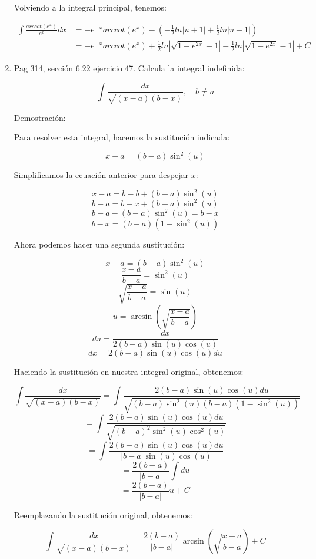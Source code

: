 \documentclass{report}
\begin{document}
\begin{enumerate}
        Volviendo a la integral principal, tenemos:
        
        \begin{align*}
        \int{\frac{arccot{\left(e^x\right)}}{e^x}dx} &= -e^{-x}arccot{\left(e^x\right)} - \left(-\frac{1}{2}ln{\left|u+1\right|}+\frac{1}{2}ln{\left|u-1\right|}\right) \\
        &=-e^{-x}arccot{\left(e^x\right)} + \frac{1}{2}ln{\left|\sqrt{1-e^{2x}}+1\right|} - \frac{1}{2}ln{\left|\sqrt{1-e^{2x}}-1\right|}+C
        \end{align*}
        
        \item Pag 314, sección 6.22 ejercicio 47. Calcula la integral indefinida:
        
        $$\int \frac{d x}{\sqrt{(x-a)(b-x)}}, \quad b \neq a$$
        
        Demostración:
        
        Para resolver esta integral, hacemos la sustitución indicada:
        
        $$x-a=(b-a)\sin^2(u)$$
        
        Simplificamos la ecuación anterior para despejar $x$:
        
        $$x-a=b-b+(b-a)\sin^2(u)$$
        $$b-a=b-x+(b-a)\sin^2(u)$$
        $$b-a-(b-a)\sin^2(u)=b-x$$
        $$b-x=(b-a)(1-\sin^2(u))$$
        
        Ahora podemos hacer una segunda sustitución:
        
        $$x-a=(b-a)\sin^2(u)$$
        $$\frac{x-a}{b-a}=\sin^2(u)$$
        $$\sqrt{\frac{x-a}{b-a}}=\sin(u)$$
        $$u=\arcsin{\left(\sqrt{\frac{x-a}{b-a}}\right)}$$
        $$du=\frac{dx}{2(b-a)\sin(u)\cos(u)}$$
        $$dx=2(b-a)\sin(u)\cos(u)du$$
        
        Haciendo la sustitución en nuestra integral original, obtenemos:
        
        $$\int \frac{dx}{\sqrt{(x-a)(b-x)}}=\int \frac{2(b-a)\sin(u)\cos(u)du}{\sqrt{(b-a)\sin^2(u)(b-a)(1-\sin^2(u))}}$$
        $$=\int \frac{2(b-a)\sin(u)\cos(u)du}{\sqrt{(b-a)^2\sin^2(u)\cos^2(u)}}$$
        $$=\int \frac{2(b-a)\sin(u)\cos(u)du}{|b-a|\sin(u)\cos(u)}$$
        $$=\frac{2(b-a)}{|b-a|}\int du$$
        $$=\frac{2(b-a)}{|b-a|}u+C$$
        
        Reemplazando la sustitución original, obtenemos:
        
        $$\int \frac{dx}{\sqrt{(x-a)(b-x)}}=\frac{2(b-a)}{|b-a|}\arcsin{\left(\sqrt{\frac{x-a}{b-a}}\right)}+C$$
        

\end{enumerate}
\end{document}
